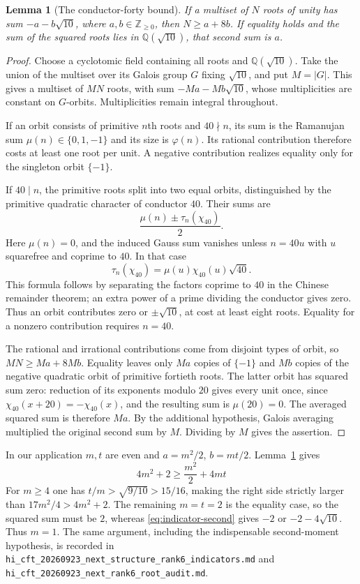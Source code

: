 \documentclass[11pt,a4paper]{article}
\newtheorem{lemma}[theorem]{Lemma}
\theoremstyle{definition}
\newcommand{\artifact}[1]{\textnormal{\nolinkurl{#1}}}
\begin{document}
\begin{lemma}[The conductor-forty bound]\label{lem:conductor40}
If a multiset of $N$ roots of unity has sum $-a-b\sqrt{10}$, where
$a,b\in\mathbb Z_{\ge0}$, then $N\ge a+8b$. If equality holds and
the sum of the squared roots lies in $\mathbb Q(\sqrt{10})$, that
second sum is $a$.
\end{lemma}
\begin{proof}
Choose a cyclotomic field containing all roots and
$\mathbb Q(\sqrt{10})$. Take the union of the multiset over its Galois
group $G$ fixing $\sqrt{10}$, and put $M=|G|$. This gives a multiset
of $MN$ roots, with sum $-Ma-Mb\sqrt{10}$, whose multiplicities are
constant on $G$-orbits. Multiplicities remain integral throughout.

If an orbit consists of primitive $n$th roots and $40\nmid n$, its
sum is the Ramanujan sum $\mu(n)\in\{0,1,-1\}$ and its size is
$\varphi(n)$. Its rational contribution therefore costs at least one
root per unit. A negative contribution realizes equality only for
the singleton orbit $\{-1\}$.

If $40\mid n$, the primitive roots split into two equal orbits,
distinguished by the primitive quadratic character of conductor $40$.
Their sums are
\[
 \frac{\mu(n)\pm\tau_n(\chi_{40})}{2}.
\]
Here $\mu(n)=0$, and the induced Gauss sum vanishes unless
$n=40u$ with $u$ squarefree and coprime to $40$. In that case
\[
 \tau_n(\chi_{40})=\mu(u)\chi_{40}(u)\sqrt{40}.
\]
This formula follows by separating the factors coprime to $40$ in the
Chinese remainder theorem; an extra power of a prime dividing the
conductor gives zero. Thus an orbit contributes zero or
$\pm\sqrt{10}$, at cost at least eight roots. Equality for a nonzero
contribution requires $n=40$.

The rational and irrational contributions come from disjoint types
of orbit, so $MN\ge Ma+8Mb$. Equality leaves only $Ma$ copies of
$\{-1\}$ and $Mb$ copies of the negative quadratic orbit of primitive
fortieth roots. The latter orbit has squared sum zero: reduction of
its exponents modulo $20$ gives every unit once, since
$\chi_{40}(x+20)=-\chi_{40}(x)$, and the resulting sum is
$\mu(20)=0$. The averaged squared sum is therefore $Ma$.
By the additional hypothesis, Galois averaging multiplied the original
second sum by $M$. Dividing by $M$ gives the assertion.
\end{proof}

In our application $m,t$ are even and $a=m^2/2$, $b=mt/2$.
Lemma~\ref{lem:conductor40} gives
\[
 4m^2+2\ge\frac{m^2}{2}+4mt
\]
For $m\ge4$ one has $t/m>\sqrt{9/10}>15/16$, making the right side
strictly larger than $17m^2/4>4m^2+2$. The remaining $m=t=2$ is the
equality case,
so the squared sum must be $2$, whereas \eqref{eq:indicator-second}
gives $-2$ or $-2-4\sqrt{10}$. Thus $m=1$.
The same argument, including the indispensable second-moment
hypothesis, is recorded in
\artifact{hi_cft_20260923_next_structure_rank6_indicators.md} and
\artifact{hi_cft_20260923_next_rank6_root_audit.md}.
\end{document}
